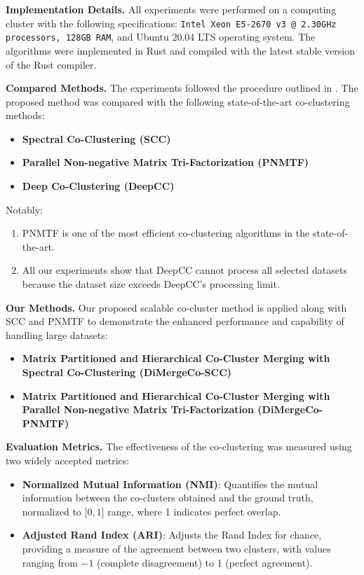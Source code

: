 \documentclass[journal]{IEEEtran}
\renewcommand{\cite}[1]{~\autocite{#1}}
\begin{document}
\textbf{Implementation Details.}
All experiments were performed on a computing cluster with the following specifications: \texttt{Intel Xeon E5-2670 v3 @ 2.30GHz processors, 128GB RAM}, and Ubuntu 20.04 LTS operating system. The algorithms were implemented in Rust and compiled with the latest stable version of the Rust compiler.

\textbf{Compared Methods.}
The experiments followed the procedure outlined in . The proposed method was compared with the following state-of-the-art co-clustering methods:
\begin{itemize}
    \item \textbf{Spectral Co-Clustering (SCC)}~\cite{dhillon2001CoclusteringDocumentsWords}
    \item \textbf{Parallel Non-negative Matrix Tri-Factorization (PNMTF)}~\cite{chen2023ParallelNonNegativeMatrix}
    \item \textbf{Deep Co-Clustering (DeepCC)}~\cite{dongkuanxu2019DeepCoClustering}
\end{itemize}

Notably:
\begin{enumerate}
    \item PNMTF is one of the most efficient co-clustering algorithms in the state-of-the-art.
    \item All our experiments show that DeepCC cannot process all selected datasets because the dataset size exceeds DeepCC's processing limit.
\end{enumerate}

\textbf{Our Methods.} Our proposed scalable co-cluster method is applied along with SCC and PNMTF to demonstrate the enhanced performance and capability of handling large datasets:
\begin{itemize}
    \item \textbf{Matrix Partitioned and Hierarchical Co-Cluster Merging with Spectral Co-Clustering (DiMergeCo-SCC)}
    \item \textbf{Matrix Partitioned and Hierarchical Co-Cluster Merging with Parallel Non-negative Matrix Tri-Factorization (DiMergeCo-PNMTF)}
\end{itemize}

\textbf{Evaluation Metrics.}
The effectiveness of the co-clustering was measured using two widely accepted metrics:
\begin{itemize}
    \item \textbf{Normalized Mutual Information (NMI)}: Quantifies the mutual information between the co-clusters obtained and the ground truth, normalized to \(\lbrack 0,1 \rbrack \) range, where 1 indicates perfect overlap.
    \item \textbf{Adjusted Rand Index (ARI)}: Adjusts the Rand Index for chance, providing a measure of the agreement between two clusters, with values ranging from $-1$ (complete disagreement) to 1 (perfect agreement).
\end{itemize}
\end{document}
